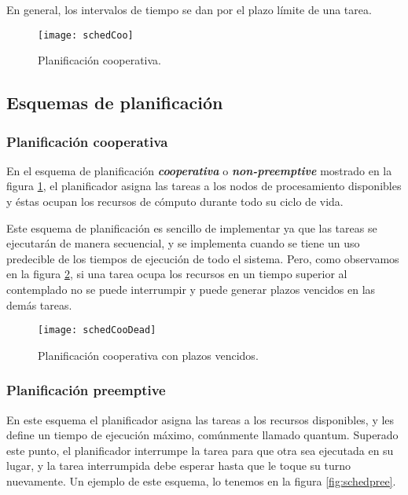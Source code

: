 En general, los intervalos de tiempo se dan por el plazo límite de una tarea.

  \begin{figure}[h!]
      \centering
        \texttt{[image: schedCoo]}
        \caption{Planificación cooperativa.\cite{medium}}
        \label{fig:schedcoo}
    \end{figure}

    \subsection{Esquemas de planificación}
    
        \subsubsection{Planificación cooperativa}

En el esquema de planificación \textit{\textbf{cooperativa}} o \textit{\textbf{non-preemptive}} mostrado en la figura \ref{fig:schedcoo}, el planificador asigna las tareas a los nodos de procesamiento disponibles y éstas ocupan los recursos de cómputo durante todo su ciclo de vida.
\newline

Este esquema de planificación es sencillo de implementar ya que las tareas se ejecutarán de manera secuencial, y se implementa cuando se tiene un uso predecible de los tiempos de ejecución de todo el sistema. Pero, como observamos en la figura \ref{fig:schedcoodead}, si una tarea ocupa los recursos en un tiempo superior al contemplado no se puede interrumpir y puede generar plazos vencidos en las demás tareas.

  \begin{figure}[h!]
      \centering
        \texttt{[image: schedCooDead]}
        \caption{Planificación cooperativa con plazos vencidos.\cite{medium}}
        \label{fig:schedcoodead}
    \end{figure}
    
\subsubsection{Planificación preemptive}

En este esquema el planificador asigna las tareas a los recursos disponibles, y les define un tiempo de ejecución máximo, comúnmente llamado quantum\cite{PreeK}. Superado este punto, el planificador interrumpe la tarea para que otra sea ejecutada en su lugar, y la tarea interrumpida debe esperar hasta que le toque su turno nuevamente. Un ejemplo de este esquema, lo tenemos en la figura \ref{fig:schedpree}.

